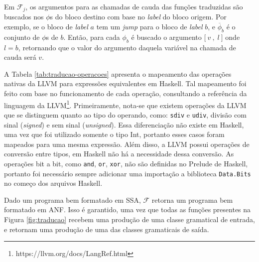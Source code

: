 Em $\mathcal{F}_j$, os argumentos para as chamadas de cauda das funções traduzidas são buscados nos $\phi$s do bloco destino com base no \emph{label} do bloco origem. Por exemplo, se o bloco de \emph{label} $a$ tem um \emph{jump} para o bloco de \emph{label} $b$, e $\overline{\phi}_b$ é o conjunto de $\phi$s de $b$. Então, para cada $\phi_b$ é buscado o argumento $\textbf{[} \ v \ \textbf{,} \ \ l \ \textbf{]}$ onde $l = b$, retornando que o valor do argumento daquela variável na chamada de cauda será $v$.

A Tabela \ref{tab:traducao-operacoes} apresenta o mapeamento das operações nativas da LLVM para expressões equivalentes em Haskell. Tal mapeamento foi feito com base no funcionamento de cada operação, consultando a referência da linguagem da LLVM\footnote{https://llvm.org/docs/LangRef.html}. Primeiramente, nota-se que existem operações da LLVM que se distinguem quanto ao tipo do operando, como: \verb|sdiv| e \verb|udiv|, divisão com sinal (\emph{signed}) e sem sinal (\emph{unsigned}). Essa diferenciação não existe em Haskell, uma vez que foi utilizado somente o tipo Int, portanto esses casos foram mapeados para uma mesma expressão. Além disso, a LLVM possui operações de conversão entre tipos, em Haskell não há a necessidade dessa conversão. As operações bit a bit, como \verb|and|, \verb|or|, \verb|xor|, não são definidas no Prelude de Haskell, portanto foi necessário sempre adicionar uma importação a biblioteca \verb|Data.Bits| no começo dos arquivos Haskell.

Dado um programa bem formatado em SSA, $\mathcal{F}$ retorna um programa bem formatado em ANF. Isso é garantido, uma vez que todas as funções presentes na Figura \ref{fig:traducao} recebem uma produção de uma classe gramatical de entrada, e retornam uma produção de uma das classes gramaticais de saída.

